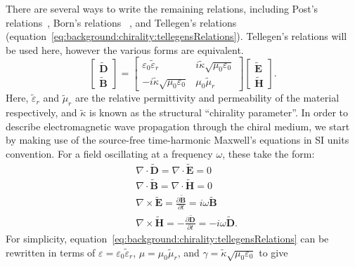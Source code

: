 There are several ways to write the remaining relations, including Post's relations~\cite{Capolino2009}, Born's relations~\cite{Lekner1999, Barnett2016} , and Tellegen's relations~\cite{Capolino2009,kong1986,lindell1994} (equation~\ref{eq:background:chirality:tellegensRelations}). Tellegen's relations will be used here, however the various forms are equivalent.
\begin{equation}\label{eq:background:chirality:tellegensRelations}
    \begin{bmatrix}
        \mathbf{\tilde D} \\
        \mathbf{\tilde B}
    \end{bmatrix}
    =
    \begin{bmatrix}
        \varepsilon_0 \tilde \varepsilon_r & i \tilde \kappa \sqrt{\mu_0 \varepsilon_0} \\
        -i \tilde \kappa \sqrt{\mu_0 \varepsilon_0} & \mu_0 \tilde \mu_r
    \end{bmatrix}
    \begin{bmatrix}
        \mathbf{\tilde E} \\
        \mathbf{\tilde H}
    \end{bmatrix}.
\end{equation}
Here, $\tilde \varepsilon_r$ and $\tilde \mu_r$ are the relative permittivity and permeability of the material respectively, and $\tilde \kappa$ is known as the structural ``chirality parameter''. In order to describe electromagnetic wave propagation through the chiral medium, we start by making use of the source-free time-harmonic Maxwell's equations in SI units convention. For a field oscillating at a frequency $\omega$, these take the form:
\begin{align}
    & \nabla \cdot \mathbf{\tilde D} = \nabla \cdot \mathbf{\tilde E} = 0 \label{eq:background:chirality:maxwellD}\\
    & \nabla \cdot \mathbf{\tilde B} = \nabla \cdot \mathbf{\tilde H} = 0 \label{eq:background:chirality:maxwellB}\\
    & \nabla \times \mathbf{\tilde E} = \frac{\partial \mathbf{\tilde B}}{\partial t} = i \omega \mathbf{\tilde B} \label{eq:background:chirality:maxwellE}\\
    & \nabla \times \mathbf{\tilde H} =  -\frac{\partial \mathbf{\tilde D}}{\partial t} = -i \omega \mathbf{\tilde D} \label{eq:background:chirality:maxwellH}.
\end{align}
For simplicity, equation~\ref{eq:background:chirality:tellegensRelations} can be rewritten in terms of $\varepsilon = \varepsilon_0 \tilde \varepsilon_r$, $\mu = \mu_0 \tilde \mu_r$, and $\gamma = \tilde \kappa \sqrt{\mu_0 \varepsilon_0}$ to give
